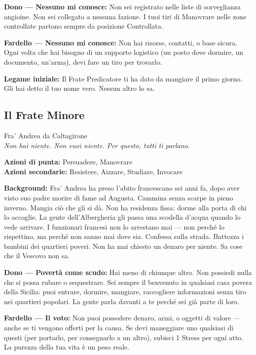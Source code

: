 \textbf{Dono — Nessuno mi conosce:} Non sei registrato nelle liste
di sorveglianza angioine. Non sei collegato a nessuna fazione.
I tuoi tiri di Manovrare nelle zone controllate partono sempre
da posizione Controllata.

\textbf{Fardello — Nessuno mi conosce:} Non hai risorse, contatti,
o base sicura. Ogni volta che hai bisogno di un supporto logistico
(un posto dove dormire, un documento, un'arma), devi fare un tiro
per trovarlo.

\textbf{Legame iniziale:} Il Frate Predicatore ti ha dato da mangiare
il primo giorno. Gli hai detto il tuo nome vero. Nessun altro lo sa.

\filetto

\subsection{Il Frate Minore}
{\cinzel\footnotesize\color{grigionote} Fra' Andrea da Caltagirone}\\
\textit{Non hai niente. Non vuoi niente. Per questo, tutti ti
parlano.}

\textbf{Azioni di punta:} Persuadere, Manovrare\\
\textbf{Azioni secondarie:} Resistere, Aizzare, Studiare, Invocare

\textbf{Background:} Fra' Andrea ha preso l'abito francescano sei
anni fa, dopo aver visto suo padre morire di fame ad Augusta.
Cammina senza scarpe in pieno inverno. Mangia ciò che gli si dà.
Non ha residenza fissa: dorme alla porta di chi lo accoglie. La
gente dell'Albergheria gli passa una scodella d'acqua quando lo
vede arrivare. I funzionari francesi non lo arrestano mai — non
perché lo rispettino, ma perché non sanno mai dove sia. Confessa
sulla strada. Battezza i bambini dei quartieri poveri. Non ha mai
chiesto un denaro per niente. Sa cose che il Vescovo non sa.

\textbf{Dono — Povertà come scudo:} Hai meno di chiunque altro.
Non possiedi nulla che si possa rubare o sequestrare. Sei sempre
il benvenuto in qualsiasi casa povera della Sicilia: puoi entrare,
dormire, mangiare, raccogliere informazioni senza tiro nei
quartieri popolari. La gente parla davanti a te perché sei già
parte di loro.

\textbf{Fardello — Il voto:} Non puoi possedere denaro, armi, o
oggetti di valore — anche se ti vengono offerti per la causa.
Se devi maneggiare uno qualsiasi di questi (per portarlo, per
consegnarlo a un altro), subisci 1 Stress per ogni atto. La
purezza della tua vita è un peso reale.

